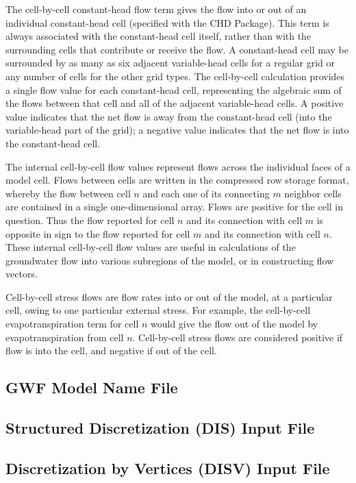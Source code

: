 The cell-by-cell constant-head flow term gives the flow into or out of an individual constant-head cell (specified with the CHD Package).  This term is always associated with the constant-head cell itself, rather than with the surrounding cells that contribute or receive the flow.  A constant-head cell may be surrounded by as many as six adjacent variable-head cells for a regular grid or any number of cells for the other grid types.  The cell-by-cell calculation provides a single flow value for each constant-head cell, representing the algebraic sum of the flows between that cell and all of the adjacent variable-head cells.  A positive value indicates that the net flow is away from the constant-head cell (into the variable-head part of the grid); a negative value indicates that the net flow is into the constant-head cell.

The internal cell-by-cell flow values represent flows across the individual faces of a model cell.  Flows between cells are written in the compressed row storage format, whereby the flow between cell $n$ and each one of its connecting $m$ neighbor cells are contained in a single one-dimensional array.  Flows are positive for the cell in question.  Thus the flow reported for cell $n$ and its connection with cell $m$ is opposite in sign to the flow reported for cell $m$ and its connection with cell $n$.  These internal cell-by-cell flow values are useful in calculations of the groundwater flow into various subregions of the model, or in constructing flow vectors.

Cell-by-cell stress flows are flow rates into or out of the model, at a particular cell, owing to one particular external stress.  For example, the cell-by-cell evapotranspiration term for cell $n$ would give the flow out of the model by evapotranspiration from cell $n$.  Cell-by-cell stress flows are considered positive if flow is into the cell, and negative if out of the cell.

\newpage
\subsection{GWF Model Name File}


\newpage
\subsection{Structured Discretization (DIS) Input File}


\newpage
\subsection{Discretization by Vertices (DISV) Input File}


